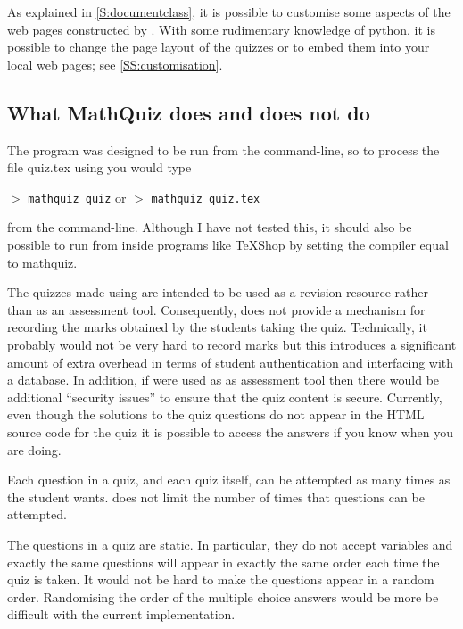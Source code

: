 \documentclass[svgnames]{article}
\begin{document}
    As explained in \autoref{S:documentclass}, it is possible to
    customise some aspects of the web pages constructed by \MathQuiz.
    With some rudimentary knowledge of python, it is possible to change the page
    layout of the quizzes or to embed them into your local web pages; see
    \autoref{SS:customisation}.

\subsection{What MathQuiz does and does not do}

    The \MathQuiz program was designed to be run from the command-line,
    so to process the file \textsf{quiz.tex} using \MathQuiz you would
    type

    $>$ \Verb|mathquiz quiz| \qquad or \qquad $>$ \Verb|mathquiz quiz.tex|

    \noindent from the command-line. Although I have not tested this, it
    should also be possible to run \MathQuiz from inside programs like
    \TeX Shop by setting the compiler equal to \textsf{mathquiz}.

    The quizzes made using \MathQuiz are intended to be used as a
    revision resource rather than as an assessment tool. Consequently,
    \MathQuiz does not provide a mechanism for recording the marks
    obtained by the students taking the quiz. Technically, it probably
    would not be very hard to record marks but this introduces a
    significant amount of extra overhead in terms of student
    authentication and interfacing with a database. In addition, if
    \MathQuiz were used as as assessment tool then there would be
    additional ``security issues'' to ensure that the quiz content is
    secure. Currently, even though the solutions to the quiz questions
    do not appear in the HTML source code for the quiz it is possible to
    access the answers if you know when you are doing.

    Each question in a quiz, and each quiz itself, can be attempted as
    many times as the student wants. \MathQuiz does not limit the number
    of times that questions can be attempted.

    The questions in a \MathQuiz quiz are static. In particular, they do
    not accept variables and exactly the same questions will appear in
    exactly the same order each time the quiz is taken. It would not be
    hard to make the questions appear in a random order. Randomising the
    order of the multiple choice answers would be more be difficult with
    the current implementation.
\end{document}

